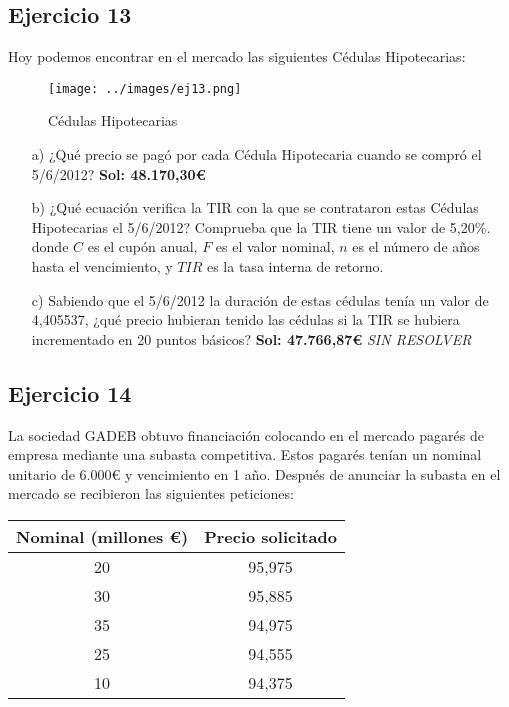 \subsection{Ejercicio 13}

Hoy podemos encontrar en el mercado las siguientes Cédulas Hipotecarias:

\begin{figure}[H]
    \centering
    \texttt{[image: ../images/ej13.png]}
    \caption{Cédulas Hipotecarias}
    \label{fig:cedulas}
\end{figure}

\begin{itemize}
    \item[a)] ¿Qué precio se pagó por cada Cédula Hipotecaria cuando se compró el 5/6/2012? \textbf{Sol: 48.170,30€}
    \item[b)] ¿Qué ecuación verifica la TIR con la que se contrataron estas Cédulas Hipotecarias el 5/6/2012? Comprueba que la TIR tiene un valor de 5,20\%.
    donde \(C\) es el cupón anual, \(F\) es el valor nominal, \(n\) es el número de años hasta el vencimiento, y \(TIR\) es la tasa interna de retorno.
    \item[c)] Sabiendo que el 5/6/2012 la duración de estas cédulas tenía un valor de 4,405537, ¿qué precio hubieran tenido las cédulas si la TIR se hubiera incrementado en 20 puntos básicos? \textbf{Sol: 47.766,87€} \textit{SIN RESOLVER}
\end{itemize}


\subsection*{Ejercicio 14}

La sociedad GADEB obtuvo financiación colocando en el mercado pagarés de empresa mediante una subasta competitiva. Estos pagarés tenían un nominal unitario de 6.000€ y vencimiento en 1 año. Después de anunciar la subasta en el mercado se recibieron las siguientes peticiones:

\begin{table}[H]
    \centering
    \begin{tabular}{|c|c|}
        \hline
        \textbf{Nominal (millones €)} & \textbf{Precio solicitado} \\ \hline
        20 & 95,975 \\ \hline
        30 & 95,885 \\ \hline
        35 & 94,975 \\ \hline
        25 & 94,555 \\ \hline
        10 & 94,375 \\ \hline
    \end{tabular}
\end{table}

